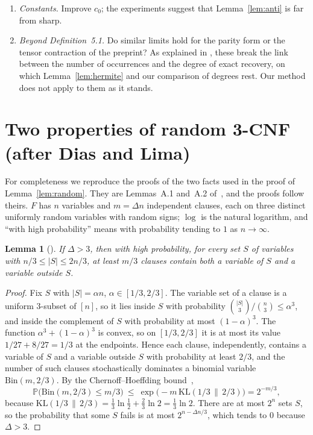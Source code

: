\documentclass[11pt,a4paper]{article}
\newtheorem{lemma}[theorem]{Lemma}
\theoremstyle{definition}
\theoremstyle{remark}
\newcommand{\PP}{\mathbb{P}}
\begin{document}
\begin{enumerate}
 the Lean statements, and to formalise Lemma~\ref{lem:random}, Corollary~\ref{cor:main} and
 Section~\ref{sec:fstar}, none of which is machine-checked.
\item \emph{Constants.} Improve $c_0$; the experiments suggest that
 Lemma~\ref{lem:anti} is far from sharp.
\item \emph{Beyond Definition~5.1.} Do similar limits hold for the parity form or the tensor
 contraction of the preprint? As explained in \cite[Section~5.1]{DL}, these break the link
 between the number of occurrences and the degree of exact recovery, on which
 Lemma~\ref{lem:hermite} and our comparison of degrees rest. Our method does not apply to
 them as it stands.
\end{enumerate}

\appendix
\section{Two properties of random 3-CNF (after Dias and Lima)}\label{app:random}

For completeness we reproduce the proofs of the two facts used in the proof of
Lemma~\ref{lem:random}. They are Lemmas~A.1 and~A.2 of~\cite{DL}, and the proofs follow
theirs. $F$ has $n$ variables and $m=\Delta n$ independent clauses, each on three distinct
uniformly random variables with random signs; $\log$ is the natural logarithm, and ``with
high probability'' means with probability tending to $1$ as $n\to\infty$.

\begin{lemma}[{\cite[Lemma~A.1]{DL}}]\label{lem:A1}
If $\Delta>3$, then with high probability, for every set $S$ of variables with
$n/3\le|S|\le2n/3$, at least $m/3$ clauses contain both a variable of $S$ and a variable
outside $S$.
\end{lemma}

\begin{proof}
Fix $S$ with $|S|=\alpha n$, $\alpha\in[1/3,2/3]$. The variable set of a clause is a uniform
$3$-subset of $[n]$, so it lies inside $S$ with probability
$\binom{|S|}{3}/\binom n3\le\alpha^3$, and inside the complement of $S$ with probability at
most $(1-\alpha)^3$. The function $\alpha^3+(1-\alpha)^3$ is convex, so on $[1/3,2/3]$ it is
at most its value $1/27+8/27=1/3$ at the endpoints. Hence each clause, independently,
contains a variable of $S$ and a variable outside $S$ with probability at least $2/3$, and
the number of such clauses stochastically dominates a binomial variable
$\mathrm{Bin}(m,2/3)$. By the Chernoff--Hoeffding bound~\cite[Theorem~1]{Hoe63},
\[
\PP\bigl(\mathrm{Bin}(m,2/3)\le m/3\bigr)\ \le\ \exp\bigl(-m\,\mathrm{KL}(1/3\,\|\,2/3)\bigr)
=2^{-m/3},
\]
because $\mathrm{KL}(1/3\,\|\,2/3)=\frac13\ln\frac12+\frac23\ln2=\frac13\ln2$. There are at
most $2^n$ sets $S$, so the probability that some $S$ fails is at most
$2^{n-\Delta n/3}$, which tends to $0$ because $\Delta>3$.
\end{proof}
\end{document}
